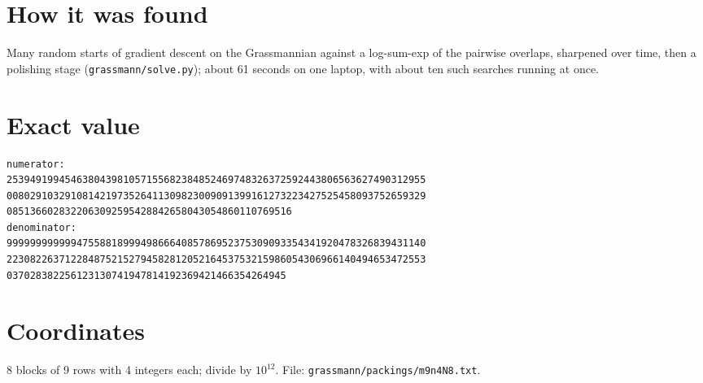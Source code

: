 \documentclass[11pt,a4paper]{article}
\begin{document}
\section{How it was found}
Many random starts of gradient descent on the Grassmannian against a log-sum-exp of the pairwise overlaps, sharpened over time, then a polishing stage (\texttt{grassmann/solve.py}); about 61 seconds on one laptop, with about ten such searches running at once.


\appendix
\section{Exact value}
{\small
\begin{verbatim}
numerator:
253949199454638043981057155682384852469748326372592443806563627490312955
008029103291081421973526411309823009091399161273223427525458093752659329
0851366028322063092595428842658043054860110769516
denominator:
999999999999475588189994986664085786952375309093354341920478326839431140
223082263712284875215279458281205216453753215986054306966140494653472553
037028382256123130741947814192369421466354264945
\end{verbatim}}

\section{Coordinates}
8 blocks of 9 rows with 4 integers each; divide by $10^{12}$. File: \texttt{grassmann/packings/m9n4N8.txt}.
{\tiny
\begin{multicols}{3}
\end{multicols}}
\end{document}
